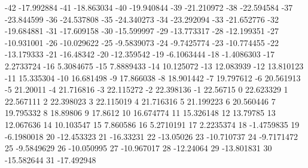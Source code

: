 -42                      -17.992884
-41                      -18.863034
-40                      -19.940844
-39                      -21.210972
-38                      -22.594584
-37                      -23.844599
-36                      -24.537808
-35                      -24.340273
-34                      -23.292094
-33                      -21.652776
-32                      -19.684881
-31                      -17.609158
-30                      -15.599997
-29                      -13.773317
-28                      -12.199351
-27                      -10.931001
-26                      -10.029622
-25                      -9.5839073
-24                      -9.7425774
-23                      -10.774455
-22                      -13.179333
-21                       -16.48342
-20                      -12.359542
-19                      -6.1063444
-18                      -1.4086303
-17                       2.2733724
-16                       5.3084675
-15                       7.8889433
-14                       10.125072
-13                       12.083939
-12                       13.810123
-11                       15.335304
-10                       16.681498
-9                       17.866038
-8                       18.901442
-7                       19.797612
-6                       20.561913
-5                        21.20011
-4                       21.716816
-3                       22.115272
-2                       22.398136
-1                        22.56715
0                       22.623329
1                       22.567111
2                       22.398023
3                       22.115019
4                       21.716316
5                       21.199223
6                       20.560446
7                       19.795332
8                        18.89806
9                         17.8612
10                       16.674774
11                       15.326148
12                        13.79785
13                       12.067636
14                       10.103547
15                        7.860586
16                       5.2710191
17                       2.2235374
18                      -1.4759835
19                      -6.1980018
20                      -12.453323
21                       -16.33231
22                       -13.05026
23                      -10.710737
24                      -9.7171472
25                      -9.5849629
26                      -10.050995
27                      -10.967017
28                       -12.24064
29                      -13.801831
30                      -15.582644
31                      -17.492948
